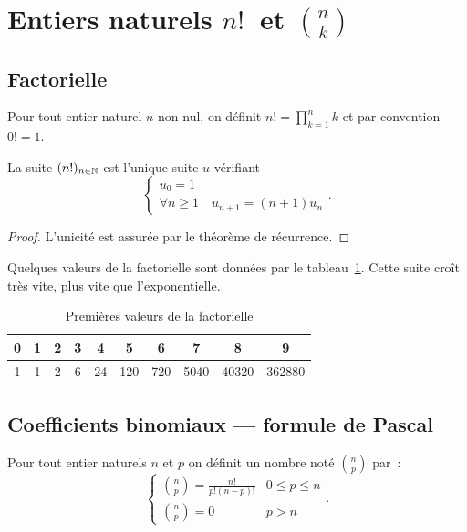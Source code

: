 \section{Entiers naturels \(n!~\) et \(\binom{n}{k}\)}

\subsection{Factorielle}

\begin{defdef}
  Pour tout entier naturel \(n\) non nul, on définit \(n! = \prod_{k = 1}^n k\)
  et par convention \(0! = 1\).
\end{defdef}

\begin{prop}
  La suite \((n!)_{n\in\mathbb{N}}\) est l'unique suite \(u\) vérifiant
  \begin{equation}
    \begin{cases}
      u_0 = 1 \\
      \forall n\geqslant 1 \quad u_{n + 1} = (n + 1) u_n
    \end{cases}.
  \end{equation}
\end{prop}
\begin{proof}
  L'unicité est assurée par le théorème de récurrence.
\end{proof}
Quelques valeurs de la factorielle sont données par le
tableau~\ref{tab:factorielle}. Cette suite croît très vite, plus vite que
l'exponentielle.

\begin{table}[h]
  \centering
  \begin{tabular}{|c|c|c|c|c|c|c|c|c|c|}
    \hline
    0 & 1 & 2 & 3 & 4  & 5   & 6   & 7    & 8     & 9 \\ \hline
    1 & 1 & 2 & 6 & 24 & 120 & 720 & 5040 & 40320 & 362880 \\ \hline
  \end{tabular}
  \caption{Premières valeurs de la factorielle}
  \label{tab:factorielle}
\end{table}

\subsection{Coefficients binomiaux --- formule de Pascal}

\begin{defdef}
  Pour tout entier naturels \(n\) et \(p\) on définit un nombre noté
  \(\binom{n}{p}\) par~:
  \begin{equation}
    \begin{cases}
      \binom{n}{p} = \frac{n!}{p!(n - p)!} & 0\leqslant p \leqslant n \\
      \binom{n}{p} = 0 & p > n
    \end{cases}.
  \end{equation}
\end{defdef}


